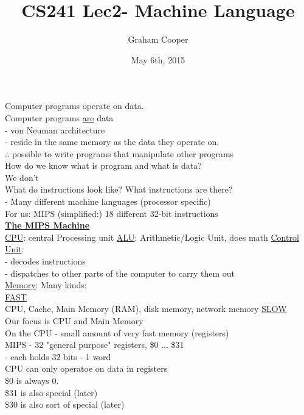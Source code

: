 \documentclass[12pt]{article}
\title{\vspace{-15ex}CS241 Lec2- Machine Language\vspace{-1ex}}
\date{May 6th, 2015}
\author{Graham Cooper}
\newcommand{\myt}[1]{\textbf{\underline{#1}}}
\begin{document}
	\maketitle
	Computer programs operate on data.\\
	Computer programs \underline{are} data\\
	- von Neuman architecture\\
	- reside in the same memory as the data they operate on.\\
	$\therefore$ possible to write programs that manipulate other programs\\
	
	How do we know what is program and what is data?\\
	We don't\\
	
	What do instructions look like? What instructions are there?\\
	- Many different machine languages (processor specific)\\
	
	For us: MIPS (simplified:) 18 different 32-bit instructions\\
	
	\myt{The MIPS Machine}\\
	
	\underline{CPU}: central Processing unit
	\underline{ALU}: Arithmetic/Logic Unit, does math
	\underline{Control Unit}:\\
	- decodes instructions\\
	- dispatches to other parts of the computer to carry them out\\
	\underline{Memory}: Many kinds:\\
	\underline{FAST} \\
	CPU, Cache, Main Memory (RAM), disk memory, network memory \underline{SLOW}\\
	
	Our focus is CPU and Main Memory\\
	On the CPU - small amount of very fast memory (registers)\\
	MIPS - 32 "general purpose" registers, \$0 ... \$31\\
	- each holds 32 bits - 1 word\\
	
	CPU can only operatoe on data in registers\\
	\$0 is always 0.\\
	\$31 is also special (later)\\
	\$30 is also sort of special (later)\\
	
\end{document}
